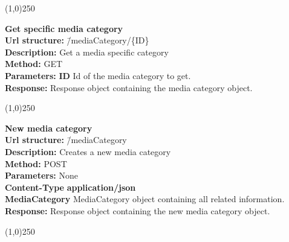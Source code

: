 \documentclass[11pt]{article}
\begin{document}
\begin{center}\line(1,0){250}\end{center}

\begin{tabbing}
\textbf{Get specific media category} \\
\textcolor{black!60}{\textbf{Url structure:}} \hspace{0.2in} \= /mediaCategory/\{ID\} \\
\textcolor{black!60}{\textbf{Description:}}  \> Get a media specific category \\
\textcolor{black!60}{\textbf{Method:}} \> GET \\
\textcolor{black!60}{\textbf{Parameters:}} \> \textbf{ID} Id of the media category to get. \\
\textcolor{black!60}{\textbf{Response:}} \> Response object containing the media category object.
\end{tabbing}

\begin{center}\line(1,0){250}\end{center}

\begin{tabbing}
\textbf{New media category} \\
\textcolor{black!60}{\textbf{Url structure:}} \hspace{0.2in} \= /mediaCategory \\
\textcolor{black!60}{\textbf{Description:}}  \> Creates a new media category \\
\textcolor{black!60}{\textbf{Method:}} \> POST \\
\textcolor{black!60}{\textbf{Parameters:}} \> None \\
\textcolor{black!60}{\textbf{Content-Type}} \> \textbf{application/json} \\
\> \textbf{MediaCategory} MediaCategory object containing all related information. \\
\textcolor{black!60}{\textbf{Response:}} \> Response object containing the new media category object.
\end{tabbing}

\begin{center}\line(1,0){250}\end{center}
\end{document}

